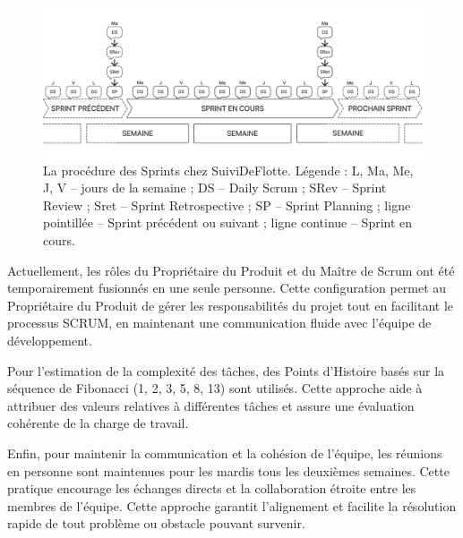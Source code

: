 \begin{figure}[h]
    \centering
    \includegraphics[width=\textwidth]{img/sprint04}
    \caption{La procédure des Sprints chez SuiviDeFlotte. Légende : L, Ma, Me, J, V -- jours de la semaine ; DS -- Daily Scrum ; SRev -- Sprint Review ; Sret -- Sprint Retrospective ; SP -- Sprint Planning ; ligne pointillée -- Sprint précédent ou suivant ; ligne continue -- Sprint en cours.}
    \label{fig:sprint}
\end{figure}

Actuellement, les rôles du Propriétaire du Produit et du Maître de Scrum ont été temporairement fusionnés en une seule personne. Cette configuration permet au Propriétaire du Produit de gérer les responsabilités du projet tout en facilitant le processus SCRUM, en maintenant une communication fluide avec l'équipe de développement.

Pour l'estimation de la complexité des tâches, des Points d'Histoire basés sur la séquence de Fibonacci (1, 2, 3, 5, 8, 13) sont utilisés. Cette approche aide à attribuer des valeurs relatives à différentes tâches et assure une évaluation cohérente de la charge de travail.

Enfin, pour maintenir la communication et la cohésion de l'équipe, les réunions en personne sont maintenues pour les mardis tous les deuxièmes semaines. Cette pratique encourage les échanges directs et la collaboration étroite entre les membres de l'équipe. Cette approche garantit l'alignement et facilite la résolution rapide de tout problème ou obstacle pouvant survenir.